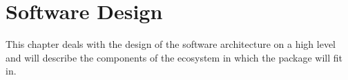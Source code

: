 \chapter{Software Design}
\label{chapter:04}
This chapter deals with the design of the software architecture on a high level and will describe the components of the ecosystem in which the package will fit in. 





